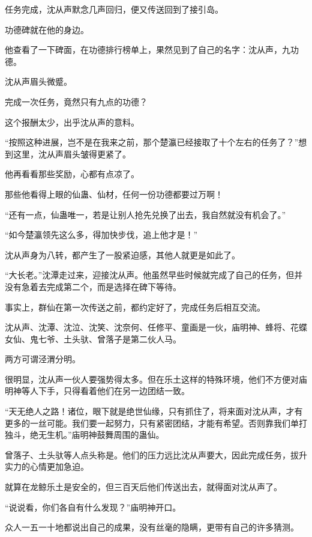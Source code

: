 
\begin{this_body}



任务完成，沈从声默念几声回归，便又传送回到了接引岛。

功德碑就在他的身边。

他查看了一下碑面，在功德排行榜单上，果然见到了自己的名字：沈从声，九功德。

沈从声眉头微蹙。

完成一次任务，竟然只有九点的功德？

这个报酬太少，出乎沈从声的意料。

“按照这种进展，岂不是在我来之前，那个楚瀛已经接取了十个左右的任务了？”想到这里，沈从声眉头皱得更紧了。

他再看看那些奖励，心都有点凉了。

那些他看得上眼的仙蛊、仙材，任何一份功德都要过万啊！

“还有一点，仙蛊唯一，若是让别人抢先兑换了出去，我自然就没有机会了。”

“如今楚瀛领先这么多，得加快步伐，追上他才是！”

沈从声身为八转，都产生了一股紧迫感，其他人就更是如此了。

“大长老。”沈潭走过来，迎接沈从声。他虽然早些时候就完成了自己的任务，但并没有急着去完成第二个，而是选择在碑下等待。

事实上，群仙在第一次传送之前，都约定好了，完成任务后相互交流。

沈从声、沈潭、沈泣、沈笑、沈奈何、任修平、童画是一伙，庙明神、蜂将、花蝶女仙、鬼七爷、土头驮、曾落子是第二伙人马。

两方可谓泾渭分明。

很明显，沈从声一伙人要强势得太多。但在乐土这样的特殊环境，他们不方便对庙明神等人下手，只得看着他们在另一边团结一致。

“天无绝人之路！诸位，眼下就是绝世仙缘，只有抓住了，将来面对沈从声，才有更多的一丝可能。我们要一起努力，只有紧密团结，才能有希望。否则靠我们单打独斗，绝无生机。”庙明神鼓舞周围的蛊仙。

曾落子、土头驮等人点头称是。他们的压力远比沈从声要大，因此完成任务，拔升实力的心情更加急迫。

就算在龙鲸乐土是安全的，但三百天后他们传送出去，就得面对沈从声了。

“说说看，你们各自有什么发现？”庙明神开口。

众人一五一十地都说出自己的成果，没有丝毫的隐瞒，更带有自己的许多猜测。


\end{this_body}
